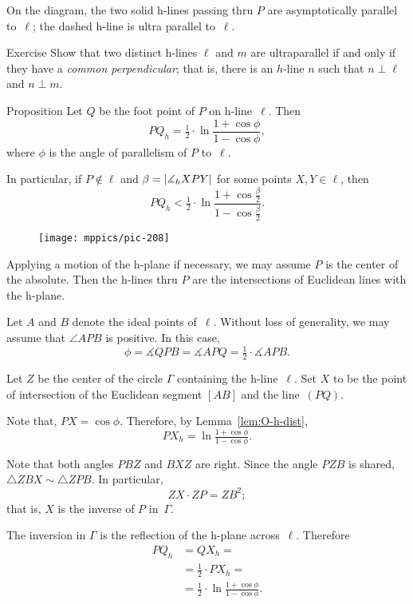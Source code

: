 On the diagram, the two solid h-lines passing thru $P$ are asymptotically parallel to~$\ell$;
the dashed h-line is ultra parallel to~$\ell$.


\begin{thm}{Exercise}\label{ex:ultra-parallel}
Show that two distinct h-lines $\ell$ and $m$ are ultraparallel if and only if they have a \emph{common perpendicular};
that is, there is an $h$-line $n$ such that $n\perp \ell$ and $n\perp m$.
\end{thm}






\begin{thm}{Proposition}\label{prop:angle-parallelism}
Let $Q$ be the foot point of $P$ on h-line~$\ell$.
Then
\[PQ_h=\tfrac12\cdot\ln \frac{1+\cos\phi}{1-\cos\phi},\]
where $\phi$ is the angle of parallelism of $P$ to~$\ell$.

In particular, if $P\notin\ell$ and $\beta\z=|\measuredangle_h XPY|$ for some points $X,Y\in\ell$, then 
\[PQ_h<\tfrac12\cdot\ln \frac{1+\cos\tfrac\beta2}{1-\cos\tfrac\beta2}.\]

\end{thm}

\begin{wrapfigure}{o}{50mm}
\vskip-6mm
\centering
\texttt{[image: mppics/pic-208]}
\end{wrapfigure}


 Applying a motion of the h-plane if necessary,
we may assume $P$ is the center of the absolute.
Then the h-lines thru $P$ are the intersections of Euclidean lines with the h-plane.

Let $A$ and $B$ denote the ideal points of~$\ell$.
Without loss of generality, we may assume that $\angle APB$ 
is positive.
In this case, 
$$\phi=\measuredangle QPB=\measuredangle APQ=\tfrac12 \cdot\measuredangle APB.$$

Let $Z$ be the center of the circle $\Gamma$ containing the h-line~$\ell$.
Set $X$ to be the point of intersection of the Euclidean segment $[AB]$ and the line~$(PQ)$.

Note that, $PX=\cos\phi$.
Therefore, by Lemma~\ref{lem:O-h-dist},
$$PX_h=\ln \tfrac{1+\cos\phi}{1-\cos\phi}.$$

Note that both angles $PBZ$ and $BXZ$ are right.
Since the angle $PZB$ is shared, $\triangle ZBX\sim \triangle ZPB$.
In particular, 
$$ZX\cdot ZP=ZB^2;$$
that is, $X$ is the inverse of $P$ in~$\Gamma$.

The inversion in $\Gamma$ is the reflection of the h-plane across~$\ell$. 
Therefore
\begin{align*}
PQ_h&=QX_h=
\\
&=\tfrac12\cdot PX_h=
\\
&=\tfrac12\cdot\ln \tfrac{1+\cos\phi}{1-\cos\phi}.
\end{align*}

